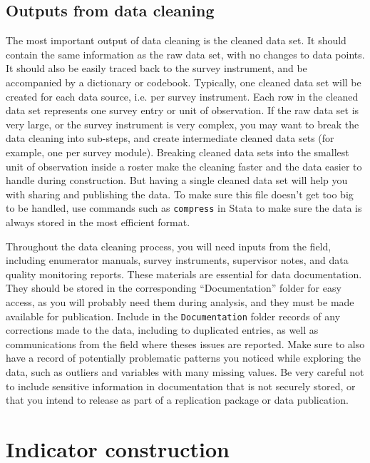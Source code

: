 \subsection{Outputs from data cleaning}

The most important output of data cleaning is the cleaned data set. 
It should contain the same information as the raw data set,
with no changes to data points.
It should also be easily traced back to the survey instrument,
and be accompanied by a dictionary or codebook.
Typically, one cleaned data set will be created for each data source,
i.e. per survey instrument.
Each row in the cleaned data set represents one survey entry or unit of observation.
If the raw data set is very large, or the survey instrument is very complex,
you may want to break the data cleaning into sub-steps, 
and create intermediate cleaned data sets
(for example, one per survey module).
Breaking cleaned data sets into the smallest unit of observation inside a roster
make the cleaning faster and the data easier to handle during construction.
But having a single cleaned data set will help you with sharing and publishing the data.
To make sure this file doesn't get too big to be handled,
use commands such as \texttt{compress} in Stata to make sure the data
is always stored in the most efficient format.

Throughout the data cleaning process, you will need inputs from the field, 
including enumerator manuals, survey instruments, 
supervisor notes, and data quality monitoring reports.
These materials are essential for data documentation.
They should be stored in the corresponding ``Documentation'' folder for easy access, 
as you will probably need them during analysis,
and they must be made available for publication.
Include in the \texttt{Documentation} folder records of any
corrections made to the data, including to duplicated entries,
as well as communications from the field where theses issues are reported.
Make sure to also have a record of potentially problematic patterns you noticed
while exploring the data, such as outliers and variables with many missing values.
Be very careful not to include sensitive information in 
documentation that is not securely stored, 
or that you intend to release as part of a replication package or data publication.

\section{Indicator construction}

